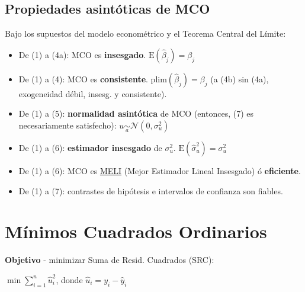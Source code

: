 \documentclass[10pt, a4paper, landscape]{extarticle}
\newcommand{\E}{\mathrm{E}}
\begin{document}
\begin{multicols}{3}
	\subsection*{Propiedades asintóticas de MCO}
		Bajo los supuestos del modelo econométrico y el Teorema Central del Límite:
		\begin{itemize}[leftmargin=*]
			\item De (1) a (4a): MCO es \textbf{insesgado}. $\E(\hat{\beta}_j) = \beta_j$
			\item De (1) a (4): MCO es \textbf{consistente}. $\mathrm{plim}(\hat{\beta}_j) = \beta_j$ (a (4b) sin (4a), exogeneidad débil, insesg. y consistente).
			\item De (1) a (5): \textbf{normalidad asintótica} de MCO (entonces, (7) es necesariamente satisfecho): $u \underset{a}{\sim} \mathcal{N}(0,\sigma^2_u)$
			\item De (1) a (6): \textbf{estimador insesgado} de $\sigma^2_u$. $\E(\hat{\sigma}^2_u) = \sigma^2_u$
			\item De (1) a (6): MCO es \textcolor{blue}{\href{https://www.youtube.com/watch?v=68ugkg9RePc}{MELI}} (Mejor Estimador Lineal Insesgado) ó \textbf{eficiente}. 
			\item De (1) a (7): contrastes de hipótesis e intervalos de confianza son fiables.
		\end{itemize}

\section*{Mínimos Cuadrados Ordinarios}
	\textbf{Objetivo} - minimizar Suma de Resid. Cuadrados (SRC):
	\begin{center}
		$\min \sum_{i=1}^n \hat{u}_i^2$, donde $\hat{u}_i = y_i - \hat{y}_i$
	\end{center}

\end{multicols}
\end{document}
